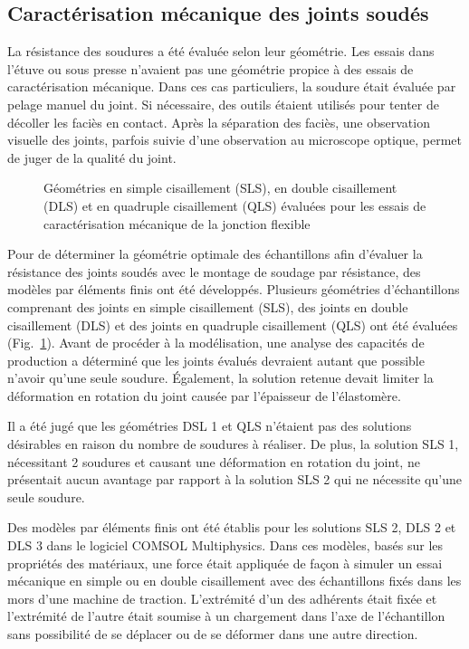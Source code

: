 \subsection{Caractérisation mécanique des joints soudés}

La résistance des soudures a été évaluée selon leur géométrie. 
Les essais dans l'étuve ou sous presse n'avaient pas une géométrie propice à des essais de caractérisation mécanique. 
Dans ces cas particuliers, la soudure était évaluée par pelage manuel du joint. 
Si nécessaire, des outils étaient utilisés pour tenter de décoller les faciès en contact. 
Après la séparation des faciès, une observation visuelle des joints, parfois suivie d'une observation au microscope optique, permet de juger de la qualité du joint. 

\begin{figure}[h]
	\centering
	
	\caption{Géométries en simple cisaillement (SLS), en double cisaillement (DLS) et en quadruple cisaillement (QLS) évaluées pour les essais de caractérisation mécanique de la jonction flexible}
	\label{fig:geometrie_echantillons}
\end{figure}
\FloatBarrier

Pour de déterminer la géométrie optimale des échantillons afin d'évaluer la résistance des joints soudés avec le montage de soudage par résistance, des modèles par éléments finis ont été développés. 
Plusieurs géométries d'échantillons comprenant des joints en simple cisaillement (SLS), des joints en double cisaillement (DLS) et des joints en quadruple cisaillement (QLS) ont été évaluées (Fig.~\ref{fig:geometrie_echantillons}). 
Avant de procéder à la modélisation, une analyse des capacités de production a déterminé que les joints évalués devraient autant que possible n'avoir qu'une seule soudure. 
Également, la solution retenue devait limiter la déformation en rotation du joint causée par l'épaisseur de l'élastomère. 

Il a été jugé que les géométries DSL 1 et QLS n'étaient pas des solutions désirables en raison du nombre de soudures à réaliser. 
De plus, la solution SLS 1, nécessitant 2 soudures et causant une déformation en rotation du joint, ne présentait aucun avantage par rapport à la solution SLS 2 qui ne nécessite qu'une seule soudure. 

Des modèles par éléments finis ont été établis pour les solutions SLS 2, DLS 2 et DLS 3 dans le logiciel COMSOL Mul\-ti\-phy\-sics\-\textregistered . 
Dans ces modèles, basés sur les propriétés des matériaux, une force était appliquée de façon à simuler un essai mécanique en simple ou en double cisaillement avec des échantillons fixés dans les mors d'une machine de traction. 
L'extrémité d'un des adhérents était fixée et l'extrémité de l'autre était soumise à un chargement dans l'axe de l'échantillon sans possibilité de se déplacer ou de se déformer dans une autre direction. 

